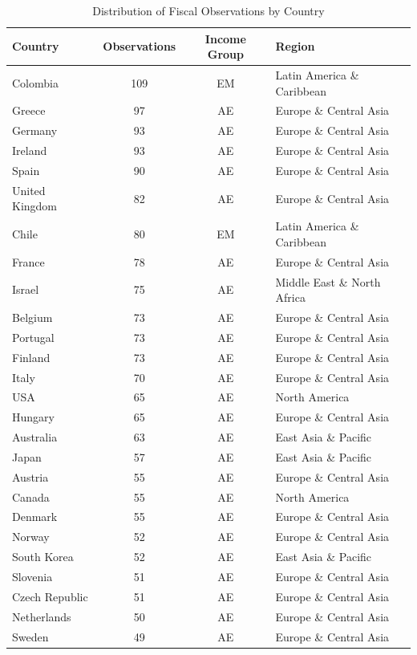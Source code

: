 \documentclass[12pt]{article}
\begin{document}
\begin{table}[htbp]
\centering
\caption{Distribution of Fiscal Observations by Country}
\label{tab:country_coverage}
\scriptsize
\begin{threeparttable}
\begin{tabular}{@{}lccl@{}}
\toprule
\textbf{Country} & \textbf{Observations} & \textbf{Income Group} & \textbf{Region} \\
\midrule
Colombia & 109 & EM & Latin America \& Caribbean \\
Greece & 97 & AE & Europe \& Central Asia \\
Germany & 93 & AE & Europe \& Central Asia \\
Ireland & 93 & AE & Europe \& Central Asia \\
Spain & 90 & AE & Europe \& Central Asia \\
United Kingdom & 82 & AE & Europe \& Central Asia \\
Chile & 80 & EM & Latin America \& Caribbean \\
France & 78 & AE & Europe \& Central Asia \\
Israel & 75 & AE & Middle East \& North Africa \\
Belgium & 73 & AE & Europe \& Central Asia \\
Portugal & 73 & AE & Europe \& Central Asia \\
Finland & 73 & AE & Europe \& Central Asia \\
Italy & 70 & AE & Europe \& Central Asia \\
USA & 65 & AE & North America \\
Hungary & 65 & AE & Europe \& Central Asia \\
Australia & 63 & AE & East Asia \& Pacific \\
Japan & 57 & AE & East Asia \& Pacific \\
Austria & 55 & AE & Europe \& Central Asia \\
Canada & 55 & AE & North America \\
Denmark & 55 & AE & Europe \& Central Asia \\
Norway & 52 & AE & Europe \& Central Asia \\
South Korea & 52 & AE & East Asia \& Pacific \\
Slovenia & 51 & AE & Europe \& Central Asia \\
Czech Republic & 51 & AE & Europe \& Central Asia \\
Netherlands & 50 & AE & Europe \& Central Asia \\
Sweden & 49 & AE & Europe \& Central Asia \\

\end{tabular}
\end{threeparttable}
\end{table}
\end{document}
